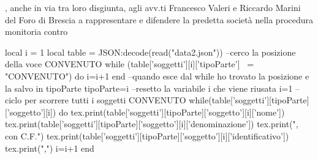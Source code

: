 \documentclass{article}
\begin{document}
, anche in via tra loro disgiunta, agli avv.ti Francesco Valeri e Riccardo Marini del Foro di Brescia a rappresentare e difendere la predetta societ\`a nella procedura monitoria contro
\begin{luacode}
 local i = 1
 local table = JSON:decode(read("data2.json"))
 --cerco la posizione della voce CONVENUTO
 while (table['soggetti'][i]['tipoParte'] ~= "CONVENUTO") do
  i=i+1
 end
 --quando esce dal while ho trovato la posizione e la salvo in tipoParte
 tipoParte=i
 --resetto la variabile i che viene riusata
 i=1
 --ciclo per scorrere tutti i soggetti CONVENUTO
 while(table['soggetti'][tipoParte]['soggetto'][i]) do
  tex.print(table['soggetti'][tipoParte]['soggetto'][i]['nome'])
    tex.print(table['soggetti'][tipoParte]['soggetto'][i]['denominazione'])
    tex.print(", con C.F.")
    tex.print(table['soggetti'][tipoParte]['soggetto'][i]['identificativo'])
    tex.print(",")
  i=i+1
 end
    
\end{luacode}
\end{document}
